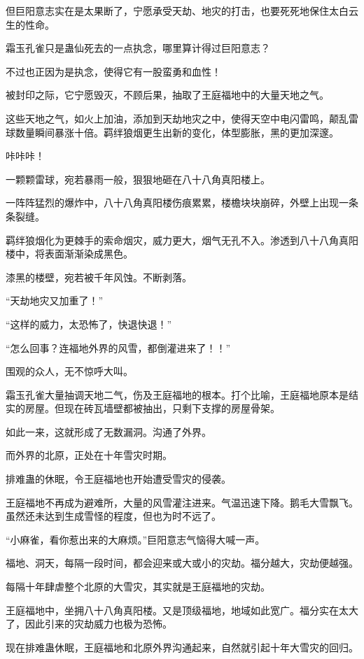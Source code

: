 \begin{this_body}
但巨阳意志实在是太果断了，宁愿承受天劫、地灾的打击，也要死死地保住太白云生的性命。

霜玉孔雀只是蛊仙死去的一点执念，哪里算计得过巨阳意志？

不过也正因为是执念，使得它有一股蛮勇和血性！

被封印之际，它宁愿毁灭，不顾后果，抽取了王庭福地中的大量天地之气。

这些天地之气，如火上加油，添加到天劫地灾之中，使得天空中电闪雷鸣，颠乱雷球数量瞬间暴涨十倍。羁绊狼烟更生出新的变化，体型膨胀，黑的更加深邃。

咔咔咔！

一颗颗雷球，宛若暴雨一般，狠狠地砸在八十八角真阳楼上。

一阵阵猛烈的爆炸中，八十八角真阳楼伤痕累累，楼檐块块崩碎，外壁上出现一条条裂缝。

羁绊狼烟化为更棘手的索命烟灾，威力更大，烟气无孔不入。渗透到八十八角真阳楼中，将表面渐渐染成黑色。

漆黑的楼壁，宛若被千年风蚀。不断剥落。

“天劫地灾又加重了！”

“这样的威力，太恐怖了，快退快退！”

“怎么回事？连福地外界的风雪，都倒灌进来了！！”

围观的众人，无不惊呼大叫。

霜玉孔雀大量抽调天地二气，伤及王庭福地的根本。打个比喻，王庭福地原本是结实的房屋。但现在砖瓦墙壁都被抽出，只剩下支撑的房屋骨架。

如此一来，这就形成了无数漏洞。沟通了外界。

而外界的北原，正处在十年雪灾时期。

排难蛊的休眠，令王庭福地也开始遭受雪灾的侵袭。

王庭福地不再成为避难所，大量的风雪灌注进来。气温迅速下降。鹅毛大雪飘飞。虽然还未达到生成雪怪的程度，但也为时不远了。

“小麻雀，看你惹出来的大麻烦。”巨阳意志气恼得大喊一声。

福地、洞天，每隔一段时间，都会迎来或大或小的灾劫。福分越大，灾劫便越强。

每隔十年肆虐整个北原的大雪灾，其实就是王庭福地的灾劫。

王庭福地中，坐拥八十八角真阳楼。又是顶级福地，地域如此宽广。福分实在太大了，因此引来的灾劫威力也极为恐怖。

现在排难蛊休眠，王庭福地和北原外界沟通起来，自然就引起十年大雪灾的回归。


\end{this_body}

